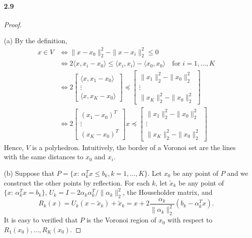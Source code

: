   \paragraph{2.9}
  \begin{proof}
    $\,$\par
    (a) By the definition, 
    \begin{align*}
      x\in V &\Leftrightarrow \|x-x_0\|_2^2-\|x-x_i\|_2^2 \le 0  \\
      &\Leftrightarrow 2\langle x,x_i-x_0\rangle 
        \le \langle x_i,x_i\rangle - \langle x_0,x_0\rangle
        \quad\text{for $i=1,\dots,K$}\\
      &\Leftrightarrow
        2\begin{bmatrix}
          \langle x,x_1-x_0 \rangle \\ \vdots \\ \langle x,x_K-x_0 \rangle
        \end{bmatrix}
        \preceq\begin{bmatrix}
          \|x_1\|_2^2-\|x_0\|_2^2 \\ \vdots \\ \|x_K\|_2^2-\|x_0\|_2^2
        \end{bmatrix} \\
      &\Leftrightarrow
      2\begin{bmatrix}
        (x_1-x_0)^T \\ \vdots \\ (x_K-x_0)^T
      \end{bmatrix}x
      \preceq\begin{bmatrix}
        \|x_1\|_2^2-\|x_0\|_2^2 \\ \vdots \\ \|x_K\|_2^2-\|x_0\|_2^2
      \end{bmatrix}
    \end{align*}
    Hence, $V$ is a polyhedron. Intuitively, the border of a Voronoi set are the 
    lines with the same distances to $x_0$ and $x_i$. \par
    (b) Suppose that $P=\{x:\,\alpha_k^Tx\le b_k, k=1,\dots,K\}$. Let $x_0$ be
    any point of $P$ and we construct the other points by reflection. For each 
    $k$, let $\tilde{x}_k$ be any point of $\{x:\,\alpha_k^Tx=b_k\}$, $U_k=I-2
    \alpha_k\alpha_k^T/\|\alpha_k\|^2_2$, the Householder matrix, and 
    \[
      R_k(x) = U_k(x-\tilde{x}_k)+\tilde{x}_k = 
      x + 2\frac{\alpha_k}{\|\alpha_k\|_2^2}(b_k-\alpha_k^Tx).
    \]
    It is easy to verified that $P$ is the Voronoi region of $x_0$ with respect
    to $R_1(x_0),\dots,R_K(x_0)$.\par
  \end{proof}

